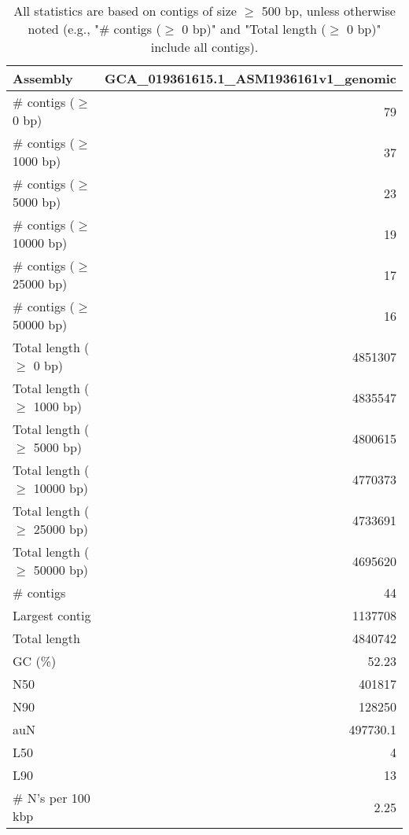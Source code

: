 \documentclass[12pt,a4paper]{article}
\begin{document}
\begin{table}[ht]
\begin{center}
\caption{All statistics are based on contigs of size $\geq$ 500 bp, unless otherwise noted (e.g., "\# contigs ($\geq$ 0 bp)" and "Total length ($\geq$ 0 bp)" include all contigs).}
\begin{tabular}{|l*{1}{|r}|}
\hline
Assembly & GCA\_019361615.1\_ASM1936161v1\_genomic \\ \hline
\# contigs ($\geq$ 0 bp) & 79 \\ \hline
\# contigs ($\geq$ 1000 bp) & 37 \\ \hline
\# contigs ($\geq$ 5000 bp) & 23 \\ \hline
\# contigs ($\geq$ 10000 bp) & 19 \\ \hline
\# contigs ($\geq$ 25000 bp) & 17 \\ \hline
\# contigs ($\geq$ 50000 bp) & 16 \\ \hline
Total length ($\geq$ 0 bp) & 4851307 \\ \hline
Total length ($\geq$ 1000 bp) & 4835547 \\ \hline
Total length ($\geq$ 5000 bp) & 4800615 \\ \hline
Total length ($\geq$ 10000 bp) & 4770373 \\ \hline
Total length ($\geq$ 25000 bp) & 4733691 \\ \hline
Total length ($\geq$ 50000 bp) & 4695620 \\ \hline
\# contigs & 44 \\ \hline
Largest contig & 1137708 \\ \hline
Total length & 4840742 \\ \hline
GC (\%) & 52.23 \\ \hline
N50 & 401817 \\ \hline
N90 & 128250 \\ \hline
auN & 497730.1 \\ \hline
L50 & 4 \\ \hline
L90 & 13 \\ \hline
\# N's per 100 kbp & 2.25 \\ \hline
\end{tabular}
\end{center}
\end{table}
\end{document}
